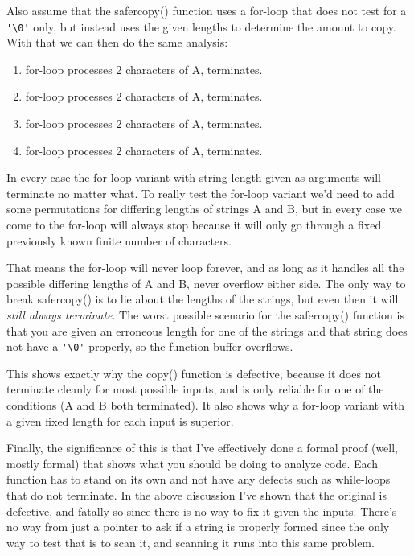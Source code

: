 Also assume that the safercopy() function uses a for-loop that does not test
for a \verb|'\0'| only, but instead uses the given lengths to determine the amount 
to copy.  With that we can then do the same analysis:

\begin{enumerate}
\item for-loop processes 2 characters of A, terminates.
\item for-loop processes 2 characters of A, terminates.
\item for-loop processes 2 characters of A, terminates.
\item for-loop processes 2 characters of A, terminates.
\end{enumerate}

In every case the for-loop variant with string length given as arguments will terminate
no matter what.  To really test the for-loop variant we'd need to add some permutations
for differing lengths of strings A and B, but in every case we come to the for-loop
will always stop because it will only go through a fixed previously known finite number
of characters.

That means the for-loop will never loop forever, and as long as it handles all the
possible differing lengths of A and B, never overflow either side.  The only way to
break safercopy() is to lie about the lengths of the strings, but even then it will
\emph{still always terminate}.  The worst possible scenario for the safercopy() function
is that you are given an erroneous length for one of the strings and that string does
not have a \verb|'\0'| properly, so the function buffer overflows.

This shows exactly why the copy() function is defective, because it does not terminate
cleanly for most possible inputs, and is only reliable for one of the conditions (A and B both
terminated).  It also shows why a for-loop variant with a given fixed length for each
input is superior.

Finally, the significance of this is that I've effectively done a formal proof (well, mostly
formal) that shows what you should be doing to analyze code.  Each function has to stand on
its own and not have any defects such as while-loops that do not terminate.  In the above
discussion I've shown that the original \krc is defective, and fatally so since there is
no way to fix it given the inputs.  There's no way from just a pointer to ask if a 
string is properly formed since the only way to test that is to scan it, and scanning it
runs into this same problem.


